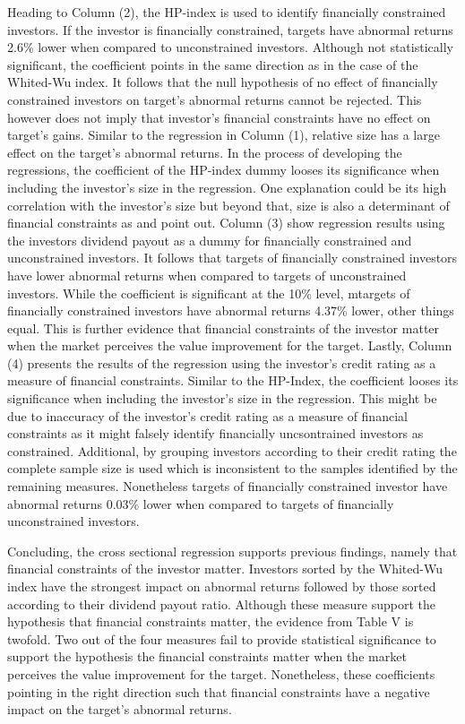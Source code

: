 \documentclass[12pt]{article}
\begin{document}
Heading to Column (2), the HP-index is used to identify financially constrained investors. If the investor is financially constrained, targets have abnormal returns 2.6\% lower when compared to unconstrained investors. Although not statistically significant, the coefficient points in the same direction as in the case of the Whited-Wu index. It follows that the null hypothesis of no effect of financially constrained investors on target's abnormal returns cannot be rejected. This however does not imply that investor's financial constraints have no effect on target's gains. Similar to the regression in Column (1), relative size has a large effect on the target's abnormal returns. In the process of developing the regressions, the coefficient of the HP-index dummy looses its significance when including the investor's size in the regression. One explanation could be its high correlation with the investor's size but beyond that, size is also a determinant of financial constraints as \citet[p.1790]{Almeida2004} and \citet[p.15]{heller2015} point out.
Column (3) show regression results using the investors dividend payout as a dummy for financially constrained and unconstrained investors. It follows that targets of financially constrained investors have lower abnormal returns when compared to targets of unconstrained investors. While the coefficient is significant at the 10\% level, mtargets of financially constrained investors have abnormal returns 4.37\% lower, other things equal. This is further evidence that financial constraints of the investor matter when the market perceives the value improvement for the target. Lastly, Column (4) presents the results of the regression using the investor's credit rating as a measure of financial constraints. Similar to the HP-Index, the coefficient looses its significance when including the investor's size in the regression. This might be due to inaccuracy of the investor's credit rating as a measure of financial constraints as it might falsely identify financially uncsontrained investors as constrained. Additional, by grouping investors according to their credit rating the complete sample size is used which is inconsistent to the samples identified by the remaining measures. Nonetheless targets of financially constrained investor have abnormal returns 0.03\% lower when compared to targets of financially unconstrained investors.

Concluding, the cross sectional regression supports previous findings, namely that financial constraints of the investor matter. Investors sorted by the Whited-Wu index have the strongest impact on abnormal returns followed by those sorted according to their dividend payout ratio. Although these measure support the hypothesis that financial constraints matter, the evidence from Table V is twofold. Two out of the four measures fail to provide statistical significance to support the hypothesis the financial constraints matter when the market perceives the value improvement for the target. Nonetheless, these coefficients pointing in the right direction such that financial constraints have a negative impact on the target's abnormal returns. 
\end{document}
